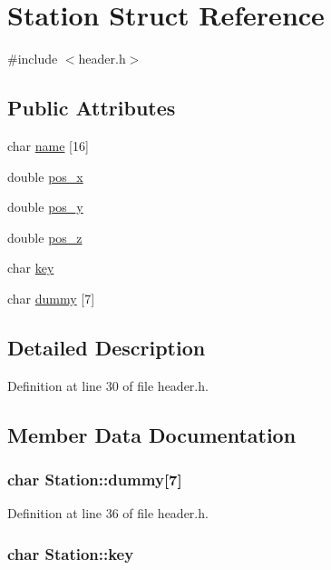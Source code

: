 \hypertarget{structStation}{
\section{Station Struct Reference}
\label{structStation}
}


{\ttfamily \#include $<$header.h$>$}\subsection*{Public Attributes}
\begin{DoxyCompactItemize}
\item 
char \hyperlink{structStation_ac8127951b98999b3113aef2848eac303}{name} \mbox{[}16\mbox{]}
\item 
double \hyperlink{structStation_a2a40a030fb955c58f85087a862001a2b}{pos\_\-x}
\item 
double \hyperlink{structStation_a26b9715099d26217b63e13888094d99e}{pos\_\-y}
\item 
double \hyperlink{structStation_aa14c4cd7ad155ca7107fa9c329e4c963}{pos\_\-z}
\item 
char \hyperlink{structStation_aaeca45381868e7729df8280cb0cd551c}{key}
\item 
char \hyperlink{structStation_a75f30a2a488a7ed411c3e7f3cdf3878c}{dummy} \mbox{[}7\mbox{]}
\end{DoxyCompactItemize}


\subsection{Detailed Description}


Definition at line 30 of file header.h.

\subsection{Member Data Documentation}
\hypertarget{structStation_a75f30a2a488a7ed411c3e7f3cdf3878c}{
\subsubsection[{dummy}]{\setlength{\rightskip}{0pt plus 5cm}char {\bf Station::dummy}\mbox{[}7\mbox{]}}}
\label{structStation_a75f30a2a488a7ed411c3e7f3cdf3878c}


Definition at line 36 of file header.h.\hypertarget{structStation_aaeca45381868e7729df8280cb0cd551c}{
\subsubsection[{key}]{\setlength{\rightskip}{0pt plus 5cm}char {\bf Station::key}}}
\label{structStation_aaeca45381868e7729df8280cb0cd551c}


